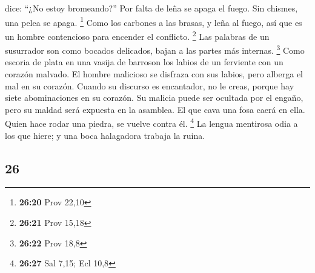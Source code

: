 \begin{paracol}{2}
dice: ``¿No estoy bromeando?''  Por falta de leña se
apaga el fuego. Sin chismes, una pelea se apaga. \footnote{\textbf{26:20}
  Prov 22,10}  Como los carbones a las brasas, y leña al
fuego, así que es un hombre contencioso para encender el conflicto.
\footnote{\textbf{26:21} Prov 15,18}  Las palabras de un
susurrador son como bocados delicados, bajan a las partes más internas.
\footnote{\textbf{26:22} Prov 18,8}  Como escoria de
plata en una vasija de barroson los labios de un ferviente con un
corazón malvado.  El hombre malicioso se disfraza con sus
labios, pero alberga el mal en su corazón.  Cuando su
discurso es encantador, no le creas, porque hay siete abominaciones en
su corazón.  Su malicia puede ser ocultada por el engaño,
pero su maldad será expuesta en la asamblea.  El que cava
una fosa caerá en ella. Quien hace rodar una piedra, se vuelve contra
él. \footnote{\textbf{26:27} Sal 7,15; Ecl 10,8}  La
lengua mentirosa odia a los que hiere; y una boca halagadora trabaja la
ruina.

\switchcolumn
\begin{otherlanguage}{english}

\hypertarget{section-51}{%
\section{26}\label{section-51}}


\end{otherlanguage}
\end{paracol}
